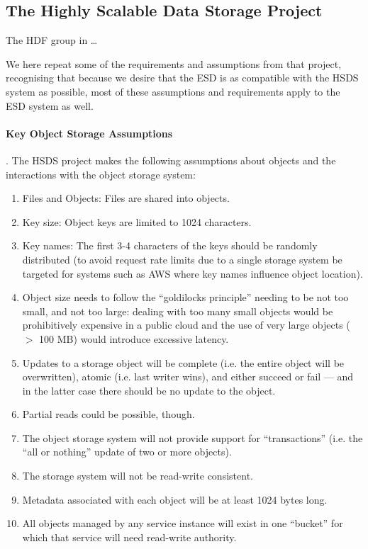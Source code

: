 \subsection{The Highly Scalable Data Storage Project}

The HDF group in \dots
{}

We here repeat some of the requirements and assumptions from that project,
recognising that because we desire that the ESD is as compatible with the HSDS system as possible, most of these assumptions and requirements apply to the ESD
system as well.

\paragraph{Key Object Storage Assumptions}. The HSDS project makes the following assumptions about objects and the interactions with the object storage system:
\begin{enumerate}
    \item Files and Objects: Files are shared into objects.
    \item Key size: Object keys are limited to 1024 characters.
    \item Key names: The first 3-4 characters of the keys should be randomly distributed (to avoid request rate limits due to a single storage system be targeted for systems such as AWS where key names influence object location).
    \item Object size needs to follow the ``goldilocks principle'' needing to be not too small, and not too large: dealing with too many small objects would be prohibitively expensive in a public cloud and the use of very large objects ($>$ 100 MB) would introduce excessive latency.
    \item Updates to a storage object will be complete (i.e. the entire object will be overwritten), atomic (i.e. last writer wins), and either succeed or fail --- and in the latter case there should be no update to the object.
    \item Partial reads could be possible, though.
    \item The object storage system will not provide support for ``transactions'' (i.e. the ``all or nothing'' update of two or more objects).
    \item The storage system will not be read-write consistent.
    \item Metadata associated with each object will be at least 1024 bytes long.
    \item All objects managed by any service instance will exist in one ``bucket'' for which that service will need read-write authority.
\end{enumerate}

